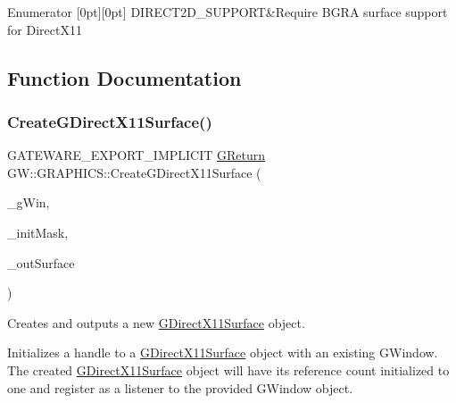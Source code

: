 \begin{DoxyEnumFields}{Enumerator}
[0pt][0pt]{}\mbox{\label{namespaceGW_1_1GRAPHICS_afbd9d6f65375744d2338ce060d42c85ba9c847baaca0bdcb897b2332cc8d3b5dc}} 
D\+I\+R\+E\+C\+T2\+D\+\_\+\+S\+U\+P\+P\+O\+RT&Require B\+G\+RA surface support for Direct\+X11 \\
\hline

\end{DoxyEnumFields}


\subsection{Function Documentation}
\mbox{\label{namespaceGW_1_1GRAPHICS_a3fc9ce5171f60466f1e8784ea13b31ce}} 
\subsubsection{\texorpdfstring{CreateGDirectX11Surface()}{CreateGDirectX11Surface()}}
{\footnotesize\ttfamily G\+A\+T\+E\+W\+A\+R\+E\+\_\+\+E\+X\+P\+O\+R\+T\+\_\+\+I\+M\+P\+L\+I\+C\+IT \mbox{\hyperlink{namespaceGW_a67a839e3df7ea8a5c5686613a7a3de21}{G\+Return}} G\+W\+::\+G\+R\+A\+P\+H\+I\+C\+S\+::\+Create\+G\+Direct\+X11\+Surface (\begin{DoxyParamCaption}\item[{\mbox{\hyperlink{classGW_1_1SYSTEM_1_1GWindow}{S\+Y\+S\+T\+E\+M\+::\+G\+Window}} $\ast$}]{\+\_\+g\+Win,  }\item[{unsigned long long}]{\+\_\+init\+Mask,  }\item[{\mbox{\hyperlink{classGW_1_1GRAPHICS_1_1GDirectX11Surface}{G\+Direct\+X11\+Surface}} $\ast$$\ast$}]{\+\_\+out\+Surface }\end{DoxyParamCaption})}



Creates and outputs a new \mbox{\hyperlink{classGW_1_1GRAPHICS_1_1GDirectX11Surface}{G\+Direct\+X11\+Surface}} object. 

Initializes a handle to a \mbox{\hyperlink{classGW_1_1GRAPHICS_1_1GDirectX11Surface}{G\+Direct\+X11\+Surface}} object with an existing G\+Window. The created \mbox{\hyperlink{classGW_1_1GRAPHICS_1_1GDirectX11Surface}{G\+Direct\+X11\+Surface}} object will have its reference count initialized to one and register as a listener to the provided G\+Window object.


